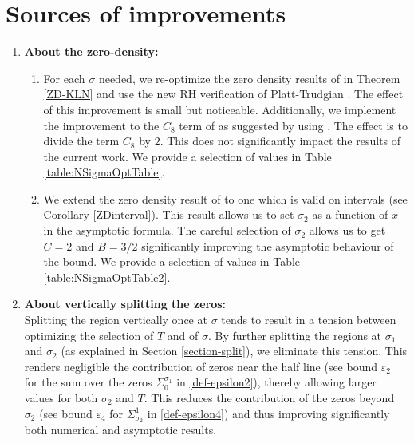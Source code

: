 \documentclass[10pt]{amsart}
\theoremstyle{definition}
\numberwithin{equation}{section}
\begin{document}
\section{Sources of improvements}\label{improvements}

 \begin{enumerate}
 \item {\bf About the zero-density:}
\begin{enumerate}
\item For each $\sigma$ needed, we re-optimize the zero density results of \cite[Theorem 1.1]{KLN18} in Theorem \ref{ZD-KLN} and use the new RH verification of Platt-Trudgian \cite{PlaTru21RH}. 
The effect of this improvement is small but noticeable.  
Additionally, we implement the improvement to the %
$C_8$ term of  \cite[Theorem 1.1]{KLN18} as suggested by \cite[Section 6]{CulJoh21} using \cite[Theorem 2]{CT21}. 
The effect is to divide the term $C_8$ by $2$. This does not significantly impact the results of the current work.
We provide a selection of values in Table \ref{table:NSigmaOptTable}.
 
 \item We extend the zero density result of \cite{KLN18} to one which is valid on intervals (see Corollary \ref{ZDinterval}). This result allows us to set $\sigma_2$ as a function of $x$ in the asymptotic formula.
 The careful selection of $\sigma_2$ allows us to get $C=2$ and $B=3/2$ significantly improving the asymptotic behaviour of the bound.
   We provide a selection of values in Table \ref{table:NSigmaOptTable2}.
\end{enumerate}

 \item {\bf About vertically splitting the zeros:}\\
Splitting the region vertically once at $\sigma$ tends to result in a tension between optimizing the selection of $T$ and of $\sigma$. 
By further splitting the regions at $\sigma_1$ and $\sigma_2$ (as explained in Section \ref{section-split}), we eliminate this tension. This renders negligible the contribution of zeros near the half line (see bound $\varepsilon_2$ for the sum over the zeros $\Sigma_{0}^{\sigma_1}$ in \eqref{def-epsilon2}), thereby allowing larger values for both $\sigma_2$ and $T$. This reduces the contribution of the zeros beyond $\sigma_2$ (see bound $\varepsilon_4$ for $\Sigma_{\sigma_2}^1$ in \eqref{def-epsilon4}) and thus improving significantly both numerical  and asymptotic results.  


\end{enumerate}
\end{document}
